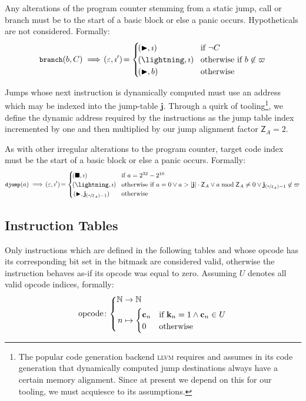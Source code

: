 Any alterations of the program counter stemming from a static jump, call or branch must be to the start of a basic block or else a panic occurs. Hypotheticals are not considered. Formally:
\begin{equation}
  \token{branch}(b, C) \implies \tup{\varepsilon, \imath'} = \begin{cases}
    \tup{\continue, \imath} &\when \lnot C \\
    \tup{\panic, \imath} &\otherwhen b \not\in \basicblocks \\
    \tup{\continue, b} &\otherwise
  \end{cases}
\end{equation}

Jumps whose next instruction is dynamically computed must use an address which may be indexed into the jump-table $\mathbf{j}$. Through a quirk of tooling\footnote{The popular code generation backend \textsc{llvm} requires and assumes in its code generation that dynamically computed jump destinations always have a certain memory alignment. Since at present we depend on this for our tooling, we must acquiesce to its assumptions.}, we define the dynamic address required by the instructions as the jump table index incremented by one and then multiplied by our jump alignment factor $\mathsf{Z}_A = 2$.

As with other irregular alterations to the program counter, target code index must be the start of a basic block or else a panic occurs. Formally:
\begin{equation}\label{eq:jumptablealignment}
  \token{djump}(a) \implies \tup{\varepsilon, \imath'} = \begin{cases}
    \tup{\halt, \imath} &\when a = 2^{32} - 2^{16}\\
    \tup{\panic, \imath} &\otherwhen a = 0 \vee a > \len{\mathbf{j}}\cdot\mathsf{Z}_A \vee a \bmod \mathsf{Z}_A \ne 0 \vee \mathbf{j}_{(\nicefrac{a}{\mathsf{Z}_A}) - 1} \not\in \basicblocks \\
    (\continue, \mathbf{j}_{(\nicefrac{a}{\mathsf{Z}_A}) - 1}) &\otherwise
  \end{cases}
\end{equation}

\subsection{Instruction Tables}\label{sec:instructiontables}

Only instructions which are defined in the following tables and whose opcode has its corresponding bit set in the bitmask are considered valid, otherwise the instruction behaves as-if its opcode was equal to zero. Assuming $U$ denotes all valid opcode indices, formally:
\begin{equation}
  \text{opcode}\colon\abracegroup{
    \N &\to \N\\
    n &\mapsto \begin{cases}
    \mathbf{c}_n &\when \mathbf{k}_n = 1 \wedge \mathbf{c}_n \in U \\
    0 &\otherwise
    \end{cases}
  }
\end{equation}


